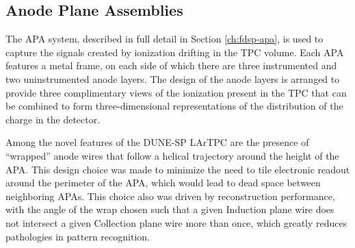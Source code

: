 

\subsection{Anode Plane Assemblies}
\label{sec:fdsp-ov-apa}

The APA system, described in full detail in Section \ref{ch:fdsp-apa}, is used to capture the signals created by ionization drifting in the TPC volume.  Each APA features a metal frame, on each side of which there are three instrumented and two uninstrumented anode layers.  The design of the anode layers is arranged to provide three complimentary views of the ionization present in the TPC that can be combined to form three-dimensional representations of the distribution of the charge in the detector.  

Among the novel features of the DUNE-SP LArTPC are the presence of ``wrapped'' anode wires that follow a helical trajectory around the height of the APA.  This design choice was made to minimize the need to tile electronic readout around the perimeter of the APA, which would lead to dead space between neighboring APAs.  This choice also was driven by reconstruction performance, with the angle of the wrap chosen such that a given Induction plane wire does not intersect a given Collection plane wire more than once, which greatly reduces pathologies in pattern recognition. 


